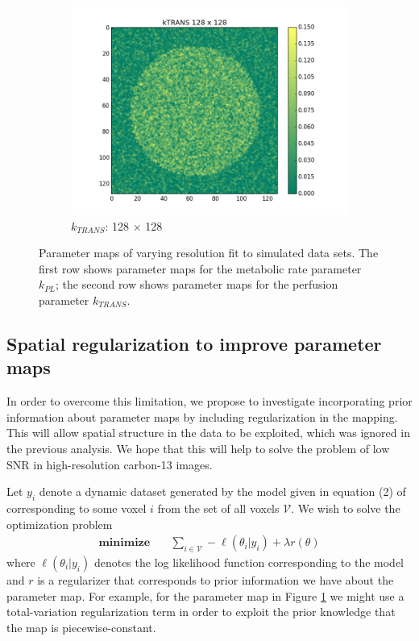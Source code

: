 \documentclass{article}
\begin{document}
\begin{figure}
    \begin{subfigure}[b]{0.25\textwidth}
        \includegraphics[width=\textwidth]{figs/kTRANS_128.png}
        \caption{$k_{TRANS}$: 128 $\times$ 128}
    \end{subfigure}
    \caption{Parameter maps of varying resolution fit to simulated data sets. The first row shows parameter maps for the metabolic rate parameter $k_{PL}$; the second row shows parameter maps for the perfusion parameter $k_{TRANS}$. }\label{fig:effect_of_resolution}
\end{figure}

\subsection{Spatial regularization to improve parameter maps} 
In order to overcome this limitation, we propose to investigate incorporating prior information about parameter maps by including regularization in the mapping. This will allow spatial structure in the data to be exploited, which was ignored in the previous analysis. We hope that this will help to solve the problem of low SNR in high-resolution carbon-13 images. 

Let $y_i$ denote a dynamic dataset generated by the model given in equation (2) of \cite{Maidens16} corresponding to some voxel $i$ from the set of all voxels $\mathcal{V}$. We wish to solve the optimization problem  
\begin{equation}
\begin{split}
\textbf{minimize} & \quad  \sum_{i \in \mathcal{V}} -\ell(\theta_i | y_i) + \lambda r(\theta) 
\end{split} 
\label{eq:opt}
\end{equation} 
where $\ell(\theta_i | y_i)$ denotes the log likelihood function corresponding to the model and $r$ is a regularizer that corresponds to prior information we have about the parameter map. For example, for the parameter map in Figure \ref{fig:effect_of_resolution} we might use a total-variation regularization term in order to exploit the prior knowledge that the map is piecewise-constant. 
\end{document}
